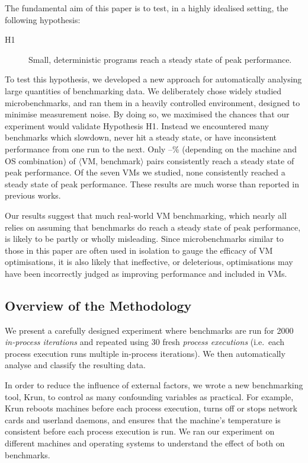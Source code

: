 \documentclass[acmsmall,screen]{acmart}
\newcommand{\krun}{Krun\xspace}
\newcommand{\hypone}{H1\xspace}
\newcommand{\vmbpair}{$\langle$VM, benchmark$\rangle$\xspace}
\newcommand{\numpexecs}{30\xspace}
\newcommand{\numiterations}{2000\xspace}
\begin{document}
The fundamental aim of this paper is to test, in a highly idealised setting, the following hypothesis:
\begin{description}
  \item[\hypone] Small, deterministic programs reach a steady state of peak performance.
\end{description}

To test this hypothesis, we developed a new approach for
automatically analysing large quantities of benchmarking data. We deliberately chose
widely studied microbenchmarks, and ran them in a heavily
controlled environment, designed to minimise measurement noise. By doing so, we
maximised the chances that our experiment would validate Hypothesis \hypone. Instead
we encountered many benchmarks which slowdown, never hit a steady
state, or have inconsistent performance from one run to the next.
Only \mintwo--\maxtwo\% (depending on the machine and OS
combination) of \vmbpair pairs consistently reach a steady state of peak
performance. Of the seven VMs we studied, none consistently reached a steady
state of peak performance. These results are much worse than reported in previous works.

Our results suggest
that much real-world VM benchmarking, which nearly all relies on assuming
that benchmarks do reach a steady state of peak performance, is likely to be partly or wholly
misleading. Since microbenchmarks similar to those in this paper are often used
in isolation to gauge the efficacy of VM optimisations, it is also likely that
ineffective, or deleterious, optimisations may have been incorrectly judged as
improving performance and included in VMs.


\subsection{Overview of the Methodology}

We present a carefully designed experiment where benchmarks are run for \numiterations
\emph{in-process iterations} and repeated using \numpexecs fresh \emph{process
executions} (i.e.~each process execution runs multiple in-process iterations).
We then automatically analyse and classify the resulting data.

In order to reduce the influence of external factors, we wrote a new
benchmarking tool, \krun, to control as many confounding variables as practical.
For example, \krun reboots machines before each process execution, turns off or stops network
cards and userland daemons, and ensures that the
machine's temperature is consistent before each process execution is run.
We ran our experiment on different machines and operating systems to understand
the effect of both on benchmarks.
\end{document}
